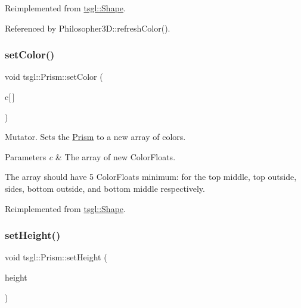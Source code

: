 Reimplemented from \hyperlink{classtsgl_1_1_shape_abdb01321cddfd2db1481eefbc2836f70}{tsgl\+::\+Shape}.



Referenced by Philosopher3\+D\+::refresh\+Color().

\mbox{\label{classtsgl_1_1_prism_a668c2779da173493efc0c4634750bd66}} 
\subsubsection{\texorpdfstring{set\+Color()}{setColor()}\hspace{0.1cm}{\footnotesize\ttfamily [2/2]}}
{\footnotesize\ttfamily void tsgl\+::\+Prism\+::set\+Color (\begin{DoxyParamCaption}\item[{\hyperlink{structtsgl_1_1_color_float}{Color\+Float}}]{c\mbox{[}$\,$\mbox{]} }\end{DoxyParamCaption})\hspace{0.3cm}{\ttfamily [virtual]}}



Mutator. Sets the \hyperlink{classtsgl_1_1_prism}{Prism} to a new array of colors. 


\begin{DoxyParams}{Parameters}
{\em c} & The array of new Color\+Floats.\\
\hline
\end{DoxyParams}
The array should have 5 Color\+Floats minimum\+: for the top middle, top outside, sides, bottom outside, and bottom middle respectively. 

Reimplemented from \hyperlink{classtsgl_1_1_shape_ad7e554b5d4cea111ec518548b9f21388}{tsgl\+::\+Shape}.

\mbox{\label{classtsgl_1_1_prism_a33bc4c80ac4d5cbb8c33a657fca01524}} 
\subsubsection{\texorpdfstring{set\+Height()}{setHeight()}}
{\footnotesize\ttfamily void tsgl\+::\+Prism\+::set\+Height (\begin{DoxyParamCaption}\item[{G\+Lfloat}]{height }\end{DoxyParamCaption})\hspace{0.3cm}{\ttfamily [virtual]}}



